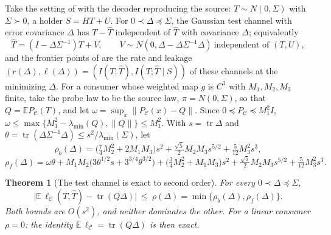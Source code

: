 \documentclass[11pt,onecolumn]{IEEEtran}
\newtheorem{theorem}{Theorem}
\newcommand{\E}{\mathbb{E}}
\newcommand{\tr}{\operatorname{tr}}
\newcommand{\PC}{P_{\mathcal C}}
\newcommand{\lmin}{\lambda_{\min}}
\begin{document}
Take the setting of \cite{part1} with the decoder reproducing the source:
$T\sim N(0,\Sigma)$ with $\Sigma\succ0$, a holder $S=HT+U$. For
$0\prec\Delta\preceq\Sigma$, the Gaussian test channel with error covariance $\Delta$
has $T-\hat T$ independent of $\hat T$ with covariance $\Delta$; equivalently
\[
\hat T=(I-\Delta\Sigma^{-1})T+V,\qquad V\sim N(0,\Delta-\Delta\Sigma^{-1}\Delta)\ \text{independent of }(T,U),
\]
and the frontier points of \cite{part1} are the rate and leakage
$(r(\Delta),\ell(\Delta))=(I(T;\hat T),I(T;\hat T\mid S))$ of these channels at the
minimizing $\Delta$. For a consumer whose weighted map $g$ is $C^3$ with $M_1,M_2,M_3$
finite, take the probe law to be the source law, $\pi=N(0,\Sigma)$, so that
$Q=\E\PC(T)$, and let $\omega=\sup_x\|\PC(x)-Q\|$. Since
$0\preceq\PC\preceq M_1^2I$, $\omega\le\max\{M_1^2-\lmin(Q),\|Q\|\}\le M_1^2$. With
$s=\tr\Delta$ and $\theta=\tr(\Delta\Sigma^{-1}\Delta)\le s^2/\lmin(\Sigma)$, let
\[
\rho_b(\Delta)=\bigl(\tfrac74M_2^2+2M_1M_3\bigr)s^2+\tfrac{\sqrt5}2M_2M_3s^{5/2}+\tfrac5{12}M_3^2s^3,
\]
\[
\rho_f(\Delta)=\omega\theta+M_1M_2\bigl(3\theta^{1/2}s+3^{3/4}\theta^{3/2}\bigr)
+\bigl(\tfrac34M_2^2+M_1M_3\bigr)s^2+\tfrac{\sqrt5}2M_2M_3s^{5/2}+\tfrac5{12}M_3^2s^3 .
\]

\begin{theorem}[The test channel is exact to second order]\label{thm:second}
For every $0\prec\Delta\preceq\Sigma$,
\[
\bigl|\E\,\ell_{\mathcal C}(T,\hat T)-\tr(Q\Delta)\bigr|\ \le\ \rho(\Delta)=\min\{\rho_b(\Delta),\rho_f(\Delta)\}.
\]
Both bounds are $O(s^2)$, and neither dominates the other. For a linear consumer
$\rho=0$: the identity $\E\,\ell_{\mathcal C}=\tr(Q\Delta)$ is then exact.
\end{theorem}
\end{document}
